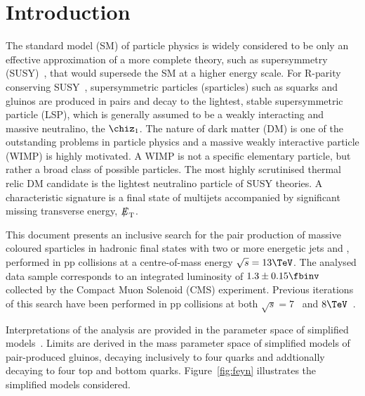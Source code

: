 \section{Introduction}
\label{sec:introduction}

The standard model (SM) of particle physics is widely considered to be
only an effective approximation of a more complete theory, such as
supersymmetry (SUSY)~\cite{ref:SUSY-1,ref:SUSY0,ref:SUSY1,ref:SUSY2,ref:SUSY3,ref:SUSY4,ref:hierarchy1,ref:hierarchy2},
that would supersede the SM at a higher energy scale. For R-parity conserving
SUSY~\cite{Farrar:1978xj}, supersymmetric particles (sparticles) such
as squarks and gluinos are produced in pairs and decay to the
lightest, stable supersymmetric particle (LSP), which is generally
assumed to be a weakly interacting and massive neutralino, the $\chiz_1$. 
The nature of dark matter (DM) is one of the outstanding problems in particle physics and a massive weakly interactive particle (WIMP) is highly motivated. A WIMP is not a specific elementary particle, but rather a broad class of possible particles. The most highly scrutinised thermal relic DM candidate is the lightest neutralino particle of SUSY theories.
A characteristic signature is a final state of multijets accompanied by
significant missing transverse energy, $\met$.

This document presents an inclusive search for the pair production of
massive coloured sparticles in hadronic final states with two or more
energetic jets and \met, performed in pp collisions at a
centre-of-mass energy $\sqrt{s} = 13\TeV$. The analysed data sample
corresponds to an integrated luminosity of $1.3 \pm 0.15 \fbinv$~\cite{lumi} collected by the Compact Muon Solenoid (CMS)
experiment. Previous iterations of this search have been performed in
pp collisions at both $\sqrt{s} = 7$~\cite{RA1Paper, RA1Paper2011, RA1Paper2011FULL} and $8\TeV$~\cite{RA1Paper2012}.

Interpretations of the analysis are provided in the parameter space of simplified models~\cite{Alwall:2008ag, Alwall:2008va, sms}. Limits are derived in the mass parameter space of simplified models of pair-produced gluinos, decaying inclusively to four quarks and addtionally decaying to four top and bottom quarks. Figure~\ref{fig:feyn} illustrates the simplified models considered.

